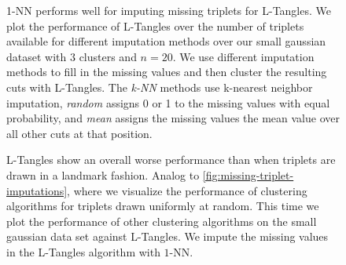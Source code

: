 \begin{figure}[ht]
    \centering
    \resizebox{0.7\textwidth}{!}{}
    \caption{
        1-NN performs well for imputing missing triplets for L-Tangles.
        We plot the performance of L-Tangles over the number of triplets available for different imputation methods over our small gaussian dataset with $3$ clusters
        and $n=20$. We use different imputation methods to fill in the missing values and then cluster the resulting cuts with L-Tangles.
        The \textit{k-NN} methods use k-nearest neighbor imputation, \textit{random} assigns 0 or 1 to the missing values with equal probability, and \textit{mean} assigns the missing
        values the mean value over all other cuts at that position.
    }
    \label{fig:missing-triplet-imputations}
\end{figure}

\begin{figure}[ht]
    \centering
    \resizebox{0.7\textwidth}{!}{}
    \caption{
        L-Tangles show an overall worse performance than when triplets are drawn in a landmark fashion.
        Analog to \autoref{fig:missing-triplet-imputations}, where we visualize the performance of clustering algorithms for triplets drawn uniformly at random. 
        This time we plot the performance of other clustering algorithms on the small gaussian data set against L-Tangles.
        We impute the missing values in the L-Tangles algorithm with $1$-NN.
    }
    \label{fig:missing-triplet-performance}
\end{figure}





